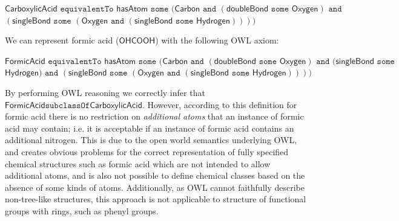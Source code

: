\documentclass[10pt]{bmc_article}
\newenvironment{bmcformat}{\baselineskip20pt\sloppy\setboolean{publ}{false}}{\baselineskip20pt\sloppy}
\begin{document}
\begin{bmcformat}
\noindent $\mathsf{CarboxylicAcid} \texttt{ equivalentTo } \mathsf{hasAtom} \texttt{ some } 
	(\mathsf{Carbon} \texttt{ and } (\mathsf{doubleBond} \texttt{ some } \mathsf{Oxygen}) 
	    \texttt{ and }$ \\ \hspace*{24mm}$(\mathsf{singleBond} \texttt{ some } (\mathsf{Oxygen} \texttt{ and } (\mathsf{singleBond} \texttt{ some } \mathsf{Hydrogen}))))$

\noindent We can represent formic acid ($\mathsf{OHCOOH}$) with the following OWL axiom:

\noindent $\mathsf{FormicAcid} \texttt{ equivalentTo } \mathsf{hasAtom} \texttt{ some } 
	( \mathsf{Carbon} \texttt{ and } (\mathsf{doubleBond} \texttt{ some } \mathsf{Oxygen}) \texttt{ and } (\mathsf{singleBond} \texttt{ some }$
	 \\ \hspace*{24mm}$ \mathsf{Hydrogen}) \texttt{ and } (\mathsf{singleBond} \texttt{ some } (\mathsf{Oxygen} \texttt{ and } (\mathsf{singleBond} \texttt{ some } \mathsf{Hydrogen}))))$
  
\noindent By performing OWL reasoning we correctly infer that $\mathsf{FormicAcid} \texttt{subclassOf} \mathsf{CarboxylicAcid}$. However, according to this definition for formic acid there is no restriction on \textit{additional atoms} that an instance of formic acid may contain; i.e. it is acceptable if an instance of formic acid contains an additional nitrogen. This is due to the open world semantics underlying OWL, and creates obvious problems for the correct representation of fully specified chemical structures such as formic acid which are not intended to allow additional atoms, and is also not possible to define chemical classes based on the absence of some kinds of atoms. Additionally, as OWL cannot faithfully describe non-tree-like structures, this approach is not applicable to structure of functional groups with rings, such as phenyl groups. 


\end{bmcformat}
\end{document}
